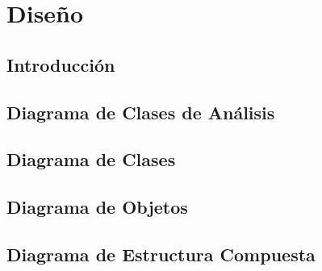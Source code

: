 \chapter{Diseño}

\section{Introducción}

\newpage

\section{Diagrama de Clases de Análisis}

\newpage

\section{Diagrama de Clases}

\newpage

\section{Diagrama de Objetos}

\newpage

\section{Diagrama de Estructura Compuesta}

\newpage